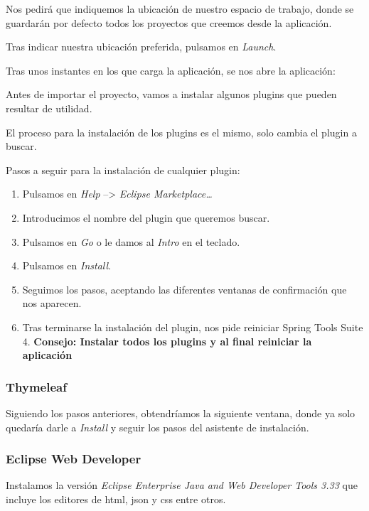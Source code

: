 Nos pedirá que indiquemos la ubicación de nuestro espacio de trabajo, donde se guardarán por defecto todos los proyectos que creemos desde la aplicación.

Tras indicar nuestra ubicación preferida, pulsamos en \textit{Launch}.

Tras unos instantes en los que carga la aplicación, se nos abre la aplicación:


Antes de importar el proyecto, vamos a instalar algunos plugins que pueden resultar de utilidad.

El proceso para la instalación de los plugins es el mismo, solo cambia el plugin a buscar.

Pasos a seguir para la instalación de cualquier plugin:
\begin{enumerate}
	\item Pulsamos en \textit{Help} --> \textit{Eclipse Marketplace\dots}
	\item Introducimos el nombre del plugin que queremos buscar.
	\item Pulsamos en \textit{Go} o le damos al \textit{Intro} en el teclado.
	\item Pulsamos en \textit{Install}.
	\item Seguimos los pasos, aceptando las diferentes ventanas de confirmación que nos aparecen.
	\item Tras terminarse la instalación del plugin, nos pide reiniciar Spring Tools Suite 4. \textbf{Consejo: Instalar todos los plugins y al final reiniciar la aplicación}
\end{enumerate}

\subsubsection{Thymeleaf}

Siguiendo los pasos anteriores, obtendríamos la siguiente ventana, donde ya solo quedaría darle a \textit{Install} y seguir los pasos del asistente de instalación.

\subsubsection{Eclipse Web Developer}

Instalamos la versión \textit{Eclipse Enterprise Java and Web Developer Tools 3.33} que incluye los editores de html, json y css entre otros.

